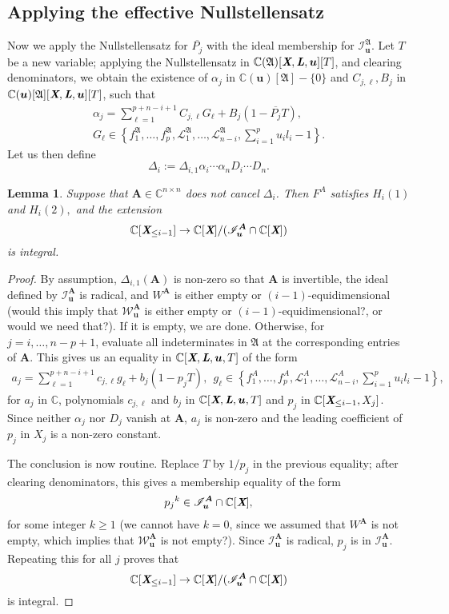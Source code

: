 \documentclass[a4paper]{article}
\def\A{\mathfrak{A}}
\def\Lb{\textit{\textbf{L}}}
\def\Xb{\textit{\textbf{X}}}
\def\mA{{\bm A}}
\def\ub{{\bm u}}
\def\pjb{\overline{P_{j}}}
\def\D{\Delta}
\def\C{\mathbb{C}}
\def\Il{\mathscr{I}_{\ub}}
\def\Wl{\mathscr{W}_{\ub}}
\def\udl{\sum_{i=1}^pu_il_i}
\newtheorem{lemma}[theorem]{Lemma}
\begin{document}
\subsection{Applying the effective Nullstellensatz}
Now we apply the Nullstellensatz for $\pjb$ with the ideal membership for $\Il^{\A}.$ Let $T$ be a new variable; applying the
Nullstellensatz in $\C(\A)[\Xb,\Lb,\ub][T]$, and clearing
denominators, we obtain the existence of $\alpha_j$ in
$\C(\ub)[\A]-\{0\}$ and $ C_{j,\ell},B_j$ in
$\C(\ub)[\A][\Xb,\Lb,\ub][T]$, such that
\begin{align*}
\alpha_j = \sum_{\ell=1}^{p+n-i+1} C_{j,\ell} G_\ell + B_j (1-\pjb T),\\  G_\ell \in 
\left\{ 
f_1^\A,\hdots,f_p^\A,\mathscr{L}_1^\A,\dots,\mathscr{L}_{n-i}^\A, \udl-1
\right\}.
\end{align*}
Let us then define 
$$\D_{i}:=\D_{i,1} \alpha_i \cdots \alpha_n D_i \cdots D_n.$$

\begin{lemma}\label{lem:6.4}
Suppose that $\mA \in \C^{n\times n}$ does not cancel $\D_{i}$. Then $F^A$ satisfies $H_i(1)$ and $H_i(2),$ and the extension
\[
 \C[\Xb_{\leq i-1}]\rightarrow \C[\Xb]/(\Il^{\mA} \cap \C[\Xb])
\]
is integral.
\end{lemma}

\begin{proof}
By assumption, $\D_{i,1}(\mA)$ is non-zero so that $\mA$ is
invertible, the
ideal defined by $\Il^{\mA}$ is radical, and 
$W^{\mA}$ is either empty or $(i-1)$-equidimensional (would this imply that $\Wl^{\mA}$ is either empty or $(i-1)$-equidimensional?, or would we need that?). If
it is empty, we are done. Otherwise, for $j=i,\dots,n-p+1$, evaluate all indeterminates in $\A$ at the
corresponding entries of $\mA$. This gives us
an equality in $\C[\Xb,\Lb,\ub,T]$ of the form
\begin{align*}
a_j = \sum_{\ell=1}^{p+n-i+1} c_{j,\ell} g_\ell + b_j (1-p_j T),\ \  g_\ell \in 
\left\{ 
f_1^A,\hdots,f_p^A,\mathscr{L}_1^A,\dots,\mathscr{L}_{n-i}^A, \udl-1
\right\},
\end{align*}
for $a_j$ in $\C$, polynomials $c_{j,\ell}$ and $b_j$ in
$\C[\Xb,\Lb,\ub,T]$ and $p_j$ in
$\C[\Xb_{\leq i-1},X_j]$. Since neither $\alpha_j$ nor $D_j$
vanish at $\mA$, $a_j$ is non-zero and the leading coefficient of
$p_j$ in $X_j$ is a non-zero constant.

The conclusion is now routine. Replace $T$ by $1/p_j$ in the
previous equality; after clearing denominators, this gives a
membership equality of the form 
\[
p_j{}^k \in \Il^{\mA} \cap \C[\Xb],
\]
for some integer $k \ge 1$ (we cannot have $k=0$, since we assumed that $W^{\mA}$ is not empty, which implies that $\Wl^{\mA}$ is not empty?). Since $\Il^{\mA}$ is radical,
$p_j$ is in $\Il^{\mA}$. Repeating this for all $j$ proves that 
\[
\C[\Xb_{\leq i-1}]\rightarrow\C[\Xb]/(\Il^{\mA} \cap \C[\Xb])
\]
is integral.
\end{proof}
\end{document}
